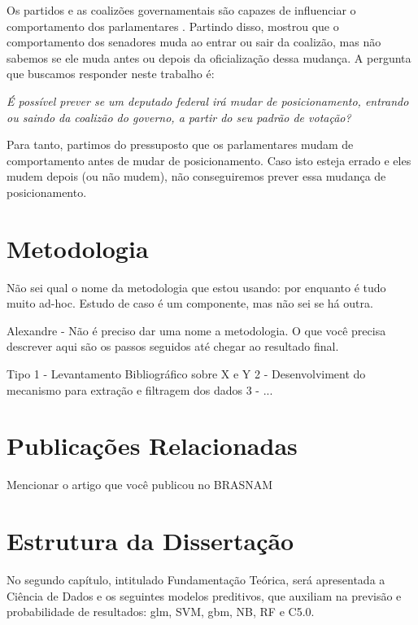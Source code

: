 Os partidos e as coalizões governamentais são capazes de influenciar o
comportamento dos parlamentares \cite{Figueiredo2001,Santos2003}. Partindo
disso,  mostrou que o comportamento dos senadores muda ao
entrar ou sair da coalizão, mas não sabemos se ele muda antes ou depois da
oficialização dessa mudança. A pergunta que buscamos responder neste trabalho
é:

\emph{É possível prever se um deputado federal irá mudar de posicionamento,
entrando ou saindo da coalizão do governo, a partir do seu padrão de votação?}

Para tanto, partimos do pressuposto que os parlamentares mudam de comportamento
antes de mudar de posicionamento. Caso isto esteja errado e eles mudem
depois (ou não mudem), não conseguiremos prever essa mudança de posicionamento.

\section{Metodologia}

Não sei qual o nome da metodologia que estou usando: por enquanto é tudo muito ad-hoc. Estudo de caso é um componente, mas não sei se há outra.

Alexandre -  Não é preciso dar uma nome a metodologia. O que você precisa descrever aqui são os passos seguidos até chegar ao resultado final.

Tipo
1 - Levantamento Bibliográfico sobre X e Y
2 - Desenvolviment do mecanismo para extração e filtragem dos dados
3 - ...

\section{Publicações Relacionadas}

Mencionar o artigo que você publicou no BRASNAM

\section{Estrutura da Dissertação}

No segundo capítulo, intitulado Fundamentação Teórica, será apresentada a
Ciência de Dados e os seguintes modelos preditivos, que auxiliam na previsão e
probabilidade de resultados: glm, SVM, gbm, NB, RF e C5.0.

